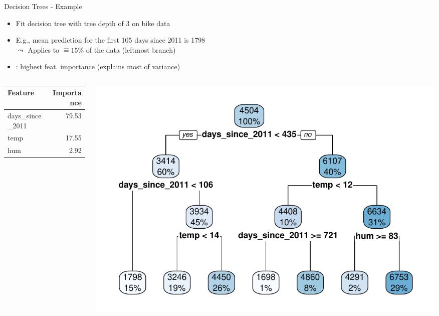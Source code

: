 \documentclass[10pt,compress,t,notes=noshow, xcolor=table]{beamer}
\begin{document}
\begin{frame}{Decision Trees - Example}
\begin{itemize}
    \item Fit decision tree with tree depth of 3 on bike data
    \item E.g., mean prediction for the first 105 days since 2011 is 1798\\
    $\leadsto$ Applies to $\hat = 15\%$ of the data (leftmost branch)
    \item {}: highest feat. importance (explains most of variance)
\end{itemize}
\begin{columns}[T, totalwidth=\textwidth]
\begin{column}{0.37\textwidth}
\vspace{1.5cm}
\begin{table}[ht]
\centering
\scriptsize
\begin{tabular}{lr}
  \hline
 Feature & Importance \\
  \hline
days\_since\_2011 & 79.53 \\ 
  temp & 17.55 \\ 
  hum & 2.92 \\ 
   \hline
\end{tabular}
\end{table}
\end{column}
\begin{column}{0.63\textwidth}
  \includegraphics[width = \textwidth]{figure/tree.pdf} 
\end{column}
\end{columns}
 
\end{frame}
\end{document}
